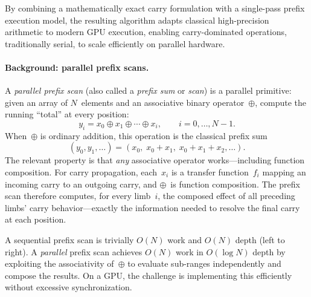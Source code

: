 By combining a mathematically exact carry formulation with a single-pass prefix
execution model, the resulting algorithm adapts classical
high-precision arithmetic to modern GPU execution, enabling
carry-dominated operations, traditionally serial, to scale
efficiently on parallel hardware.

\paragraph{Background: parallel prefix scans.}
A \emph{parallel prefix scan} (also called a \emph{prefix sum} or
\emph{scan}) is a parallel primitive: given an array of
$N$~elements and an associative binary operator~$\oplus$, compute the
running ``total'' at every position:
\[
y_i = x_0 \oplus x_1 \oplus \cdots \oplus x_i, \qquad i = 0, \ldots, N-1.
\]
When~$\oplus$ is ordinary addition, this operation is the classical prefix sum
\[
(y_0, y_1, \ldots) = (x_0,\; x_0{+}x_1,\; x_0{+}x_1{+}x_2, \ldots).
\]
The relevant property is that \emph{any} associative operator
works---including function composition.  For carry propagation,
each~$x_i$ is a transfer function~$f_i$ mapping an incoming carry to an
outgoing carry, and $\oplus$~is function composition.  The prefix scan
therefore computes, for every limb~$i$, the composed effect of all
preceding limbs' carry behavior---exactly the information needed to
resolve the final carry at each position.

A sequential prefix scan is trivially $O(N)$ work and $O(N)$ depth
(left to right).  A \emph{parallel} prefix scan achieves $O(N)$ work in
$O(\log N)$ depth by exploiting the associativity of~$\oplus$ to
evaluate sub-ranges independently and compose the results.  On a GPU,
the challenge is implementing this efficiently without excessive
synchronization.

